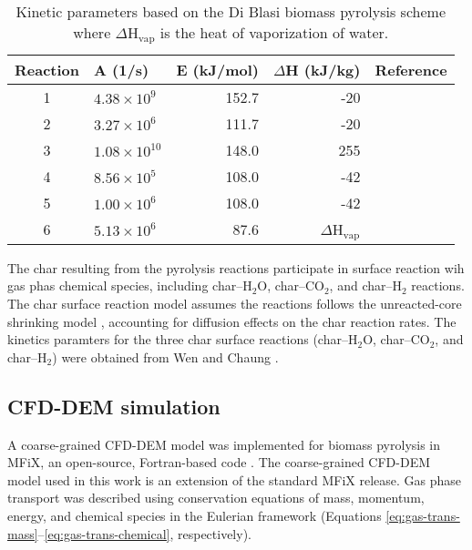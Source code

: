 \begin{table}[H]
    \centering
    \caption{Kinetic parameters based on the Di Blasi biomass pyrolysis scheme where $\Delta$H$_\text{vap}$ is the heat of vaporization of water.}
    \begin{tabular}{clrrr}
        \toprule
        Reaction & A (1/s) & E (kJ/mol) & $\Delta$H (kJ/kg) & Reference \\
        \midrule
        1 & $4.38 \times 10^9$    & 152.7 & -20                    & \cite{Blasi-2001} \\
        2 & $3.27 \times 10^6$    & 111.7 & -20                    & \cite{Blasi-2001} \\
        3 & $1.08 \times 10^{10}$ & 148.0 & 255                    & \cite{Blasi-2001} \\
        4 & $8.56 \times 10^5$    & 108.0 & -42                    & \cite{Blasi-1993,lu2020bridging} \\
        5 & $1.00 \times 10^6$    & 108.0 & -42                    & \cite{Blasi-1993} \\
        6 & $5.13 \times 10^6$    & 87.6  & $\Delta$H$_\text{vap}$ & \cite{Chan-1985} \\
        \bottomrule
    \end{tabular}
    \label{tab:kinetic-params}
\end{table}

\noindent The char resulting from the pyrolysis reactions participate in surface reaction wih gas phas chemical species, including char--H$_2$O, char--CO$_2$, and char--H$_2$ reactions. The char surface reaction model assumes the reactions follows the unreacted-core shrinking model \cite{Chyou-2013}, accounting for diffusion effects on the char reaction rates. The kinetics paramters for the three char surface reactions (char--H$_2$O, char--CO$_2$, and char--H$_2$) were obtained from Wen and Chaung \cite{Wen1979entr}.


\subsection{CFD-DEM simulation}

A coarse-grained CFD-DEM model was implemented for biomass pyrolysis in MFiX, an open-source, Fortran-based code \cite{Syamlal-1993}. The coarse-grained CFD-DEM model used in this work is an extension of the standard MFiX release. Gas phase transport was described using conservation equations of mass, momentum, energy, and chemical species in the Eulerian framework (Equations \ref{eq:gas-trans-mass}--\ref{eq:gas-trans-chemical}, respectively).

